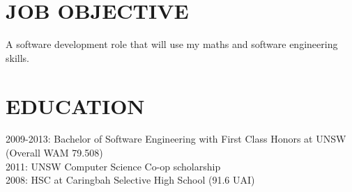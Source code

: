 \documentclass{res}
\begin{document}
 


\address{16A Old Forest Rd \\  Lugarno, NSW 2210
         \\  grasevski@gmail.com
         \\  0405 634 067}
                                  
\begin{resume}

\section{JOB OBJECTIVE}          
    A software development role that will use my maths and software engineering skills.
 
\section{EDUCATION}          
    2009-2013: Bachelor of Software Engineering with First Class Honors at UNSW (Overall WAM 79.508) \\
    2011: UNSW Computer Science Co-op scholarship \\
    2008: HSC at Caringbah Selective High School (91.6 UAI)

 

\end{resume}
\end{document}
